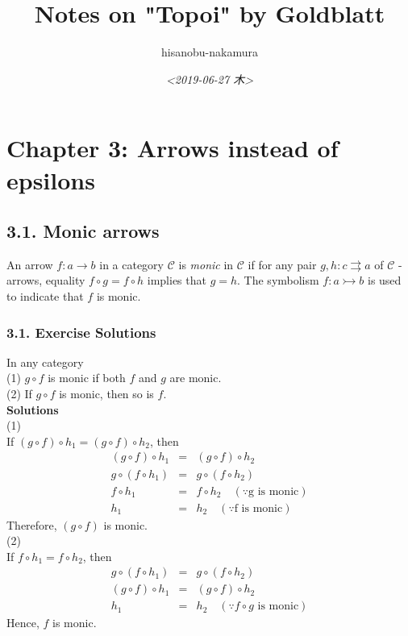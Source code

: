 \documentclass{article}
\author{hisanobu-nakamura}
\date{\textit{<2019-06-27 木>}}
\title{Notes on "Topoi" by Goldblatt}
\begin{document}
\maketitle
\tableofcontents


\section{Chapter 3: Arrows instead of epsilons}
\label{sec:org7fdf1f2}
\subsection{3.1. Monic arrows}
\label{sec:orge1a2464}
An arrow \(f:a \rightarrow b\) in a category \(\mathcal{C}\) is  \emph{monic} in \(\mathcal{C}\) if for any pair \(g,h:c \rightrightarrows a\) of \(\mathcal{C}\) -arrows, equality \(f\circ g = f \circ h\) implies that \(g=h\).
The symbolism \(f:a \rightarrowtail b\) is used to indicate that \(f\) is monic.
\subsubsection{3.1. Exercise Solutions}
\label{sec:orgfe2eec1}
In any category \\
(1) \(g \circ f\) is monic if both \(f\) and \(g\) are monic.\\
(2) If \(g \circ f\) is monic, then so is \(f\).\\
\textbf{Solutions} \\
(1) \\
If \((g \circ f) \circ h_{1} = (g \circ f) \circ h_{2}\), then 
\begin{eqnarray*}
(g \circ f) \circ h_{1} &=& (g \circ f) \circ h_{2}\\
g \circ (f \circ h_{1}) &=& g \circ (f \circ h_{2})\\
f \circ h_{1} &=& f \circ h_{2}  \quad (\because \text{g is monic})\\
h_{1} &=& h_{2}  \quad (\because \text{f is monic})
\end{eqnarray*}
Therefore, \((g \circ f)\) is monic. \\
(2) \\
If \(f \circ h_{1} = f \circ h_{2}\), then 
\begin{eqnarray*}
g \circ (f \circ h_{1}) &=& g \circ (f \circ h_{2})\\
(g \circ f) \circ h_{1} &=& (g \circ f) \circ h_{2}\\
h_{1} &=& h_{2}  \quad (\because \text{$f \circ g$ is monic})
\end{eqnarray*}
Hence, \(f\) is monic.
\end{document}
